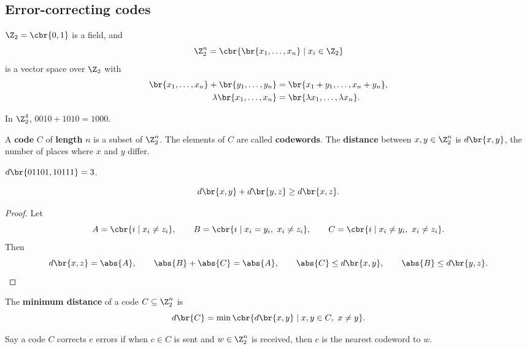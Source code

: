 \subsection{Error-correcting codes}

$ \Z_2 = \cbr{0, 1} $ is a field, and
$$ \Z_2^n = \cbr{\br{x_1, \dots, x_n} \mid x_i \in \Z_2} $$
is a vector space over $ \Z_2 $ with
\begin{align*}
\br{x_1, \dots, x_n} + \br{y_1, \dots, y_n} & = \br{x_1 + y_1, \dots, x_n + y_n}, \\
\lambda\br{x_1, \dots, x_n} & = \br{\lambda x_1, \dots, \lambda x_n}.
\end{align*}

\begin{example*}
In $ \Z_2^4 $, $ 0010 + 1010 = 1000 $.
\end{example*}

\begin{definition*}
A \textbf{code} $ C $ of \textbf{length} $ n $ is a subset of $ \Z_2^n $. The elements of $ C $ are called \textbf{codewords}. The \textbf{distance} between $ x, y \in \Z_2^n $ is $ d\br{x, y} $, the number of places where $ x $ and $ y $ differ.
\end{definition*}

\begin{example*}
$ d\br{01101, 10111} = 3 $.
\end{example*}

\begin{proposition}
\label{prop:1.1}
$$ d\br{x, y} + d\br{y, z} \ge d\br{x, z}. $$
\end{proposition}

\begin{proof}
Let
$$ A = \cbr{i \mid x_i \ne z_i}, \qquad B = \cbr{i \mid x_i = y_i, \ x_i \ne z_i}, \qquad C = \cbr{i \mid x_i \ne y_i, \ x_i \ne z_i}. $$
Then
$$ d\br{x, z} = \abs{A}, \qquad \abs{B} + \abs{C} = \abs{A}, \qquad \abs{C} \le d\br{x, y}, \qquad \abs{B} \le d\br{y, z}. $$
\end{proof}


\begin{definition*}
The \textbf{minimum distance} of a code $ C \subseteq \Z_2^n $ is
$$ d\br{C} = \min\cbr{d\br{x, y} \mid x, y \in C, \ x \ne y}. $$
\end{definition*}

Say a code $ C $ corrects $ e $ errors if when $ c \in C $ is sent and $ w \in \Z_2^n $ is received, then $ c $ is the nearest codeword to $ w $.

